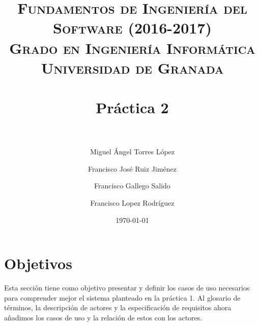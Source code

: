 



\title{	
\normalfont \normalsize 
\textsc{\textbf{Fundamentos de Ingeniería del Software (2016-2017)} \\ Grado en Ingeniería Informática \\ Universidad de Granada} \\ [25pt] %
\horrule{2pt} \\[0.4cm] %
\huge Práctica 2 \\ %
\horrule{2pt} \\[0.5cm] %
}

\author{Miguel Ángel Torres López \and Francisco José Ruiz Jiménez \and Francisco Gallego Salido \and Francisco Lopez Rodríguez} %


\date{\normalsize\today} %




\maketitle %

\newpage %

\tableofcontents %

\newpage

\listoffigures

\newpage


\section{Objetivos}

Esta sección tiene como objetivo presentar y definir los casos de uso necesarios para comprender mejor el sistema planteado en la práctica 1. Al glosario de términos, 
la descripción de actores y la especificación de requisitos ahora añadimos los casos de uso y la relación de estos con los actores.

